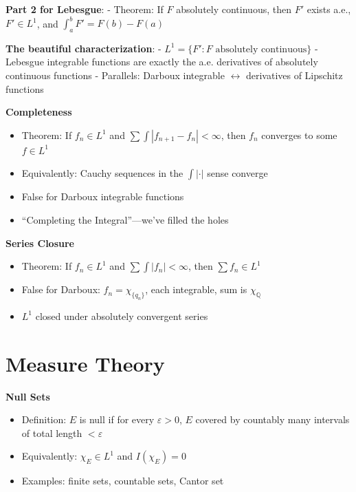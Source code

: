 \documentclass[
  10pt,
  letterpaper,
]{scrbook}
\providecommand{\tightlist}{%
  \setlength{\itemsep}{0pt}\setlength{\parskip}{0pt}}
\begin{document}
\textbf{Part 2 for Lebesgue}: - Theorem: If \(F\) absolutely continuous,
then \(F'\) exists a.e., \(F' \in L^1\), and
\(\int_a^b F' = F(b) - F(a)\)

\textbf{The beautiful characterization}: -
\(L^1 = \{F' : F \text{ absolutely continuous}\}\) - Lebesgue integrable
functions are exactly the a.e. derivatives of absolutely continuous
functions - Parallels: Darboux integrable \(\leftrightarrow\)
derivatives of Lipschitz functions

\textbf{Completeness}

\begin{itemize}
\tightlist
\item
  Theorem: If \(f_n \in L^1\) and
  \(\sum \int |f_{n+1} - f_n| < \infty\), then \(f_n\) converges to some
  \(f \in L^1\)
\item
  Equivalently: Cauchy sequences in the \(\int |\cdot|\) sense converge
\item
  False for Darboux integrable functions
\item
  ``Completing the Integral''---we've filled the holes
\end{itemize}

\textbf{Series Closure}

\begin{itemize}
\tightlist
\item
  Theorem: If \(f_n \in L^1\) and \(\sum \int |f_n| < \infty\), then
  \(\sum f_n \in L^1\)
\item
  False for Darboux: \(f_n = \chi_{\{q_n\}}\), each integrable, sum is
  \(\chi_{\mathbb{Q}}\)
\item
  \(L^1\) closed under absolutely convergent series
\end{itemize}

\section{Measure Theory}\label{measure-theory}

\textbf{Null Sets}

\begin{itemize}
\tightlist
\item
  Definition: \(E\) is null if for every \(\varepsilon > 0\), \(E\)
  covered by countably many intervals of total length \(< \varepsilon\)
\item
  Equivalently: \(\chi_E \in L^1\) and \(I(\chi_E) = 0\)
\item
  Examples: finite sets, countable sets, Cantor set
\end{itemize}
\end{document}
